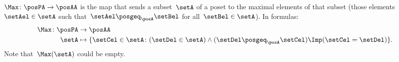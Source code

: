 \begin{definition}[Max]
  \label{def:Max}
  $\Max \colon \posPA \to \posAA$ is the map that sends a subset~$\setA$ of a poset to the maximal elements of that subset (those elements~$\setAel \in \setA$ such that~$\setAel \posgeq_\posA \setBel$ for all~$\setBel \in \setA$).
  In formulas:
  \begin{equation*}
    \begin{aligned}
      \Max \colon \posPA &\to \posAA\\
      \setA&\mapsto \{ \setCel\in \setA\colon (\setDel\in \setA)\wedge(\setDel\posgeq_\posA \setCel)\Imp (\setCel=\setDel)\}.
    \end{aligned}
  \end{equation*}
  Note that~$\Max(\setA)$ could be empty.
\end{definition}

